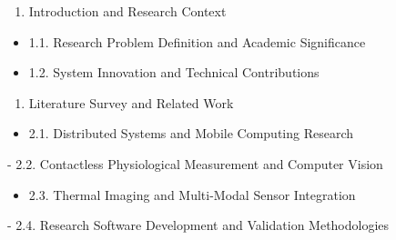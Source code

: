 \documentclass[12pt,a4paper]{article}
\begin{document}
\begin{enumerate}
\item Introduction and Research Context

\end{enumerate}
\begin{itemize}
\item 1.1. Research Problem Definition and Academic Significance
\item 1.2. System Innovation and Technical Contributions

\end{itemize}
\begin{enumerate}
\item Literature Survey and Related Work

\end{enumerate}
\begin{itemize}
\item 2.1. Distributed Systems and Mobile Computing Research
\end{itemize}
-
2.2. Contactless Physiological Measurement and Computer Vision
\begin{itemize}
\item 2.3. Thermal Imaging and Multi-Modal Sensor Integration
\end{itemize}
-
2.4. Research Software Development and Validation Methodologies
\end{document}
